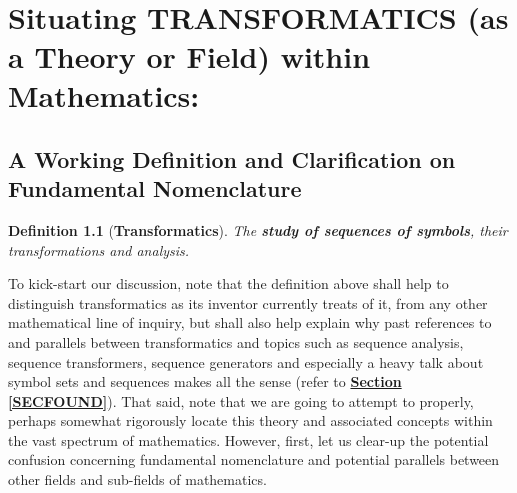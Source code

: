 \documentclass[a4paper, 18pt]{book} %
\newtheorem{defn}{Definition}
\begin{document}
\begin{appendices}
%
%


\vspace{5cm}
\\














\chapter{Situating TRANSFORMATICS (as a Theory or Field) within Mathematics:}
\label{CHAPSITTRANS}


\section{A Working Definition and Clarification on Fundamental Nomenclature}



\vspace{2em}

\begin{defn}[\textbf{Transformatics}]
\label{DEFTRANS}
The \textbf{study of sequences of symbols}, their transformations and analysis.
\end{defn}

\vspace{2em}

To kick-start our discussion, note that the definition above shall help to distinguish transformatics as its inventor currently treats of it, from any other mathematical line of inquiry, but shall also help explain why past references to and parallels between transformatics and topics such as sequence analysis, sequence transformers, sequence generators and especially a heavy talk about symbol sets and sequences makes all the sense (refer to \textbf{\hyperref[SECFOUND]{Section \ref{SECFOUND}}}). That said, note that we are going to attempt to properly, perhaps somewhat rigorously locate this theory and associated concepts within the vast spectrum of mathematics. However, first, let us clear-up the potential confusion concerning fundamental nomenclature and potential parallels between other fields and sub-fields of mathematics.


\end{appendices}
\end{document}
